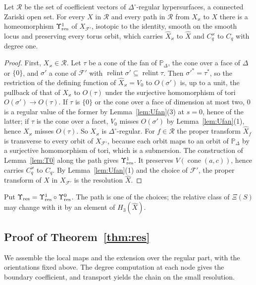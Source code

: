 \begin{lemma}\label{lem:T}
Let $\mathcal R$ be the set of coefficient vectors of $\Delta^\circ$-regular hypersurfaces, a connected Zariski open set. For
every $X$ in $\mathcal R$ and every path in $\mathcal R$ from $X_\varkappa$ to $X$ there is a homeomorphism $\Upsilon^1_{\rm res}$ of
$X_{\mathcal F'}$, isotopic to the identity, smooth on the smooth locus and preserving every torus orbit, which carries
$\widehat X_\varkappa$ to $\widehat X$ and $C_q^\varkappa$ to $C_q$ with degree one.
\end{lemma}
\begin{proof}
First, $X_\varkappa\in\mathcal R$. Let $\tau$ be a cone of the fan of $\mathbb P_\Delta$, the cone over a face of $\Delta$ or $\{0\}$, and
$\sigma'$ a cone of $\mathcal F'$ with $\operatorname{relint}\sigma'\subseteq\operatorname{relint}\tau$. Then $\sigma'^*=\tau^*$,
so the restriction of the defining function of $\widehat X_\varkappa=V_0$ to $O(\sigma')$ is, up to a unit, the pullback of that of
$X_\varkappa$ to $O(\tau)$ under the surjective homomorphism of tori $O(\sigma')\to O(\tau)$. If $\tau$ is $\{0\}$ or the cone over a
face of dimension at most two, $0$ is a regular value of the former by Lemma~\ref{lem:Ufan}(3) at $s=0$, hence of the latter;
if $\tau$ is the cone over a facet, $V_0$ misses $O(\sigma')$ by Lemma~\ref{lem:Ufan}(1), hence $X_\varkappa$ misses $O(\tau)$. So $X_\varkappa$
is $\Delta^\circ$-regular. For $f\in\mathcal R$ the proper transform $\widehat X_f$ is transverse to
every orbit of $X_{\mathcal F'}$, because each orbit maps to an orbit of $\mathbb P_\Delta$ by a surjective homomorphism of tori,
which is a submersion. The construction of Lemma~\ref{lem:T0} along the path gives $\Upsilon^1_{\rm res}$. It preserves
$V(\operatorname{cone}(a,c))$, hence carries $C^\varkappa_q$ to $C_q$. By Lemma~\ref{lem:Ufan}(1) and the choice of $\mathcal F'$, the
proper transform of $X$ in $X_{\mathcal F'}$ is the resolution $\widehat X$.
\end{proof}

Put $\Upsilon_{\rm res}=\Upsilon^1_{\rm res}\circ\Upsilon^0_{\rm res}$. The path is one of the choices; the relative class of $\Xi(S)$ may change with it by an
element of $H_3(\widehat X)$.

\subsection{Proof of Theorem~\ref{thm:res}}\label{ssec:res-proof}
We assemble the local maps and the extension over the regular part, with the orientations fixed above.
The degree computation at each node gives the boundary coefficient, and transport yields the chain on the small resolution.

